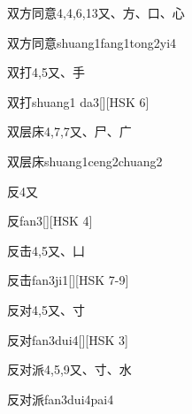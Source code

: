 \begin{Entry}{双方同意}{4,4,6,13}{⼜、⽅、⼝、⼼}
  \begin{Phonetics}{双方同意}{shuang1fang1tong2yi4}
  \end{Phonetics}
\end{Entry}

\begin{Entry}{双打}{4,5}{⼜、⼿}
  \begin{Phonetics}{双打}{shuang1 da3}[][HSK 6]
  \end{Phonetics}
\end{Entry}

\begin{Entry}{双层床}{4,7,7}{⼜、⼫、⼴}
  \begin{Phonetics}{双层床}{shuang1ceng2chuang2}
  \end{Phonetics}
\end{Entry}

\begin{Entry}{反}{4}{⼜}
  \begin{Phonetics}{反}{fan3}[][HSK 4]
  \end{Phonetics}
\end{Entry}

\begin{Entry}{反击}{4,5}{⼜、⼐}
  \begin{Phonetics}{反击}{fan3ji1}[][HSK 7-9]
  \end{Phonetics}
\end{Entry}

\begin{Entry}{反对}{4,5}{⼜、⼨}
  \begin{Phonetics}{反对}{fan3dui4}[][HSK 3]
  \end{Phonetics}
\end{Entry}

\begin{Entry}{反对派}{4,5,9}{⼜、⼨、⽔}
  \begin{Phonetics}{反对派}{fan3dui4pai4}
  \end{Phonetics}
\end{Entry}

